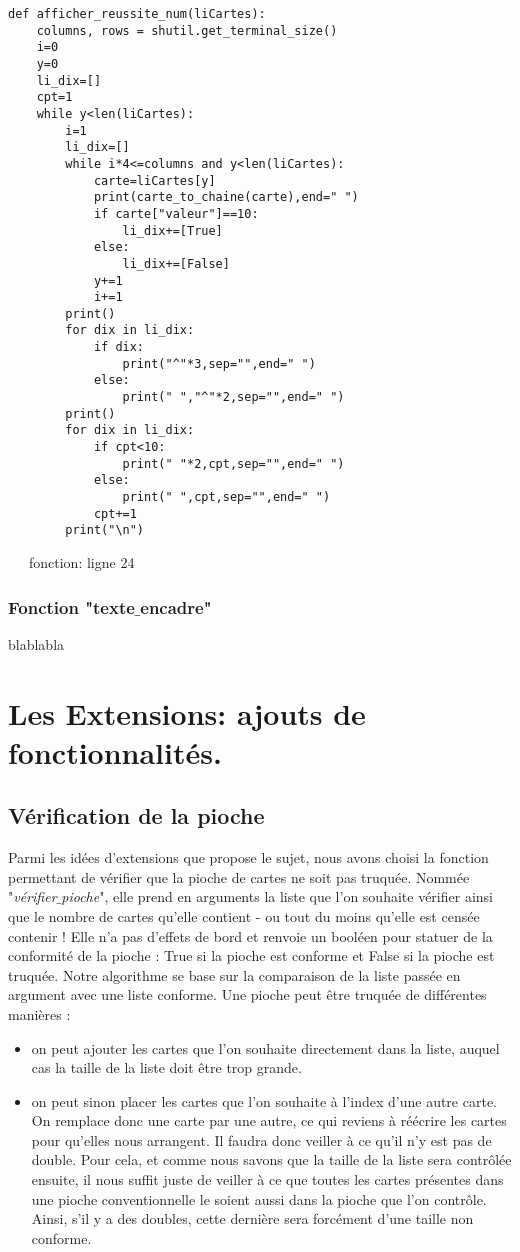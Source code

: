 \documentclass[10pt,a4paper,french,titlepage]{article}
\theoremstyle{definition}
\begin{document}
\begin{lstlisting}
def afficher_reussite_num(liCartes):
    columns, rows = shutil.get_terminal_size()
    i=0
    y=0
    li_dix=[]
    cpt=1
    while y<len(liCartes):
        i=1
        li_dix=[]
        while i*4<=columns and y<len(liCartes): 
            carte=liCartes[y]
            print(carte_to_chaine(carte),end=" ")
            if carte["valeur"]==10:
                li_dix+=[True]
            else:
                li_dix+=[False]
            y+=1
            i+=1
        print()
        for dix in li_dix:
            if dix:
                print("^"*3,sep="",end=" ")
            else:
                print(" ","^"*2,sep="",end=" ")
        print()
        for dix in li_dix:
            if cpt<10:
                print(" "*2,cpt,sep="",end=" ")
            else:
                print(" ",cpt,sep="",end=" ")
            cpt+=1
        print("\n")
\end{lstlisting}
~~~fonction: ligne 24

\subsubsection{Fonction "texte$\_$encadre"}
blablabla
\section{Les Extensions: ajouts de fonctionnalités.}
\subsection{Vérification de la pioche}
Parmi les idées d'extensions que propose le sujet, nous avons choisi la fonction permettant de vérifier que la pioche de cartes ne soit pas truquée. Nommée "\textit{vérifier$\_$pioche}", elle prend en arguments la liste que l'on souhaite vérifier ainsi que le nombre de cartes qu'elle contient - ou tout du moins qu'elle est censée contenir ! Elle n'a pas d'effets de bord et renvoie un booléen pour statuer de la conformité de la pioche : True si la pioche est conforme et False si la pioche est truquée. Notre algorithme se base sur la comparaison de la liste passée en argument avec une liste conforme. Une pioche peut être truquée de différentes manières :
\begin{itemize}
\item on peut ajouter les cartes que l'on souhaite directement dans la liste, auquel cas la taille de la liste doit être trop grande.
\item on peut sinon placer les cartes que l'on souhaite à l'index d'une autre carte. On remplace donc une carte par une autre, ce qui reviens à réécrire les cartes pour qu'elles nous arrangent. Il faudra donc veiller à ce qu'il n'y est pas de double. Pour cela, et comme nous savons que la taille de la liste sera contrôlée ensuite, il nous suffit juste de veiller à ce que toutes les cartes présentes dans une pioche conventionnelle le soient aussi dans la pioche que l'on contrôle. Ainsi, s'il y a des doubles, cette dernière sera forcément d'une taille non conforme.
\end{itemize}
\end{document}
